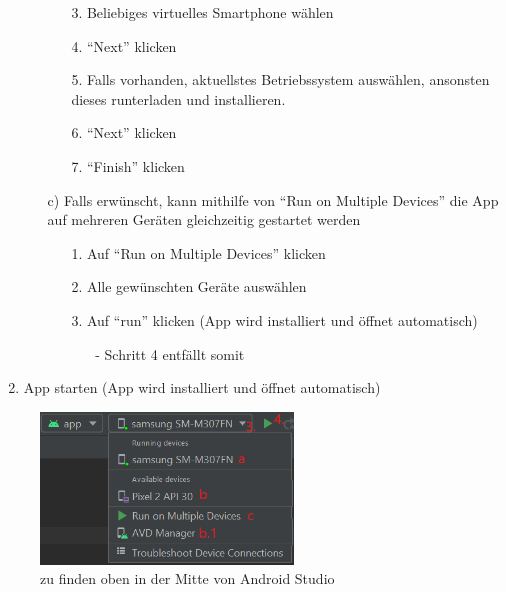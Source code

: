 \documentclass[12pt, onecolumn, notitlepage]{scrartcl}
\begin{document}
\begin{enumerate}
\begin{itemize}
\begin{itemize}
			\item[3.] Beliebiges virtuelles Smartphone wählen
			\item[4.] \enquote{Next} klicken
			\item[5.] Falls vorhanden, aktuellstes Betriebssystem auswählen, ansonsten dieses runterladen und installieren.
			\item[6.] \enquote{Next} klicken
			\item[7.] \enquote{Finish} klicken
			\end{itemize}
		\item[c)] Falls erwünscht, kann mithilfe von \enquote{Run on Multiple Devices} die App auf mehreren Geräten gleichzeitig gestartet werden
			\begin{itemize}
			\item[1.] Auf \enquote{Run on Multiple Devices} klicken
			\item[2.] Alle gewünschten Geräte auswählen
			\item[3.] Auf \enquote{run} klicken (App wird installiert und öffnet automatisch)
			\begin{itemize}
				\item[-] Schritt 4 entfällt somit
			\end{itemize}
		\end{itemize}
	\end{itemize}
	\item App starten (App wird installiert und öffnet automatisch)
\end{enumerate}
\begin{figure}[H] 
	\centering
	\includegraphics[width=0.6\textwidth]{Geraete_Auswahl_AS.png}
	\caption{zu finden oben in der Mitte von Android Studio}
\end{figure}
\end{document}
